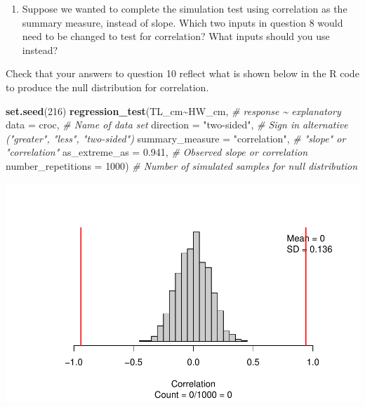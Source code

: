 \documentclass[
]{report}
\newenvironment{Shaded}{\begin{snugshade}}{\end{snugshade}}
\newcommand{\AttributeTok}[1]{\textcolor[rgb]{0.13,0.29,0.53}{#1}}
\newcommand{\CommentTok}[1]{\textcolor[rgb]{0.56,0.35,0.01}{\textit{#1}}}
\newcommand{\DecValTok}[1]{\textcolor[rgb]{0.00,0.00,0.81}{#1}}
\newcommand{\FloatTok}[1]{\textcolor[rgb]{0.00,0.00,0.81}{#1}}
\newcommand{\FunctionTok}[1]{\textcolor[rgb]{0.13,0.29,0.53}{\textbf{#1}}}
\newcommand{\NormalTok}[1]{#1}
\newcommand{\SpecialCharTok}[1]{\textcolor[rgb]{0.81,0.36,0.00}{\textbf{#1}}}
\newcommand{\StringTok}[1]{\textcolor[rgb]{0.31,0.60,0.02}{#1}}
\providecommand{\tightlist}{%
  \setlength{\itemsep}{0pt}\setlength{\parskip}{0pt}}
\begin{document}
\vspace{0.5in}

\begin{enumerate}
\def\labelenumi{\arabic{enumi}.}
\setcounter{enumi}{9}
\tightlist
\item
  Suppose we wanted to complete the simulation test using correlation as the summary measure, instead of slope. Which two inputs in question 8 would need to be changed to test for correlation? What inputs should you use instead?
\end{enumerate}

\vspace{0.75in}

Check that your answers to question 10 reflect what is shown below in the R code to produce the null distribution for correlation.

\begin{Shaded}
\begin{Highlighting}[]
\FunctionTok{set.seed}\NormalTok{(}\DecValTok{216}\NormalTok{)}
\FunctionTok{regression\_test}\NormalTok{(TL\_cm}\SpecialCharTok{\textasciitilde{}}\NormalTok{HW\_cm, }\CommentTok{\# response \textasciitilde{} explanatory}
               \AttributeTok{data =}\NormalTok{ croc, }\CommentTok{\# Name of data set}
               \AttributeTok{direction =} \StringTok{"two{-}sided"}\NormalTok{, }\CommentTok{\# Sign in alternative ("greater", "less", "two{-}sided")}
               \AttributeTok{summary\_measure =} \StringTok{"correlation"}\NormalTok{, }\CommentTok{\# "slope" or "correlation"}
               \AttributeTok{as\_extreme\_as =} \FloatTok{0.941}\NormalTok{, }\CommentTok{\# Observed slope or correlation}
               \AttributeTok{number\_repetitions =} \DecValTok{1000}\NormalTok{) }\CommentTok{\# Number of simulated samples for null distribution}
\end{Highlighting}
\end{Shaded}

\begin{center}\includegraphics[width=0.7\linewidth]{13-OCA10-regression-simulation_files/figure-latex/unnamed-chunk-6-1} \end{center}
\end{document}
